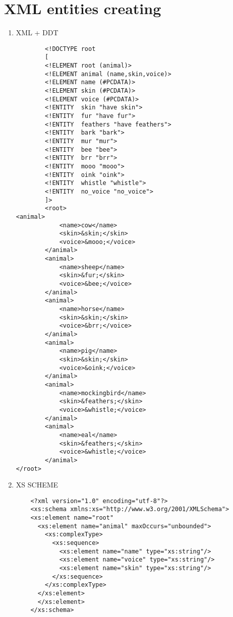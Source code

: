 \documentclass[10pt]{article}
\begin{document}
  \section{XML entities creating    \newline}
  \begin{enumerate}
    \item XML + DDT
    \begin{verbatim}
        <!DOCTYPE root
        [
        <!ELEMENT root (animal)>
        <!ELEMENT animal (name,skin,voice)>
        <!ELEMENT name (#PCDATA)>
        <!ELEMENT skin (#PCDATA)>
        <!ELEMENT voice (#PCDATA)>
        <!ENTITY  skin "have skin">
        <!ENTITY  fur "have fur">
        <!ENTITY  feathers "have feathers">
        <!ENTITY  bark "bark">
        <!ENTITY  mur "mur">
        <!ENTITY  bee "bee">
        <!ENTITY  brr "brr">
        <!ENTITY  mooo "mooo">
        <!ENTITY  oink "oink">
        <!ENTITY  whistle "whistle">
        <!ENTITY  no_voice "no_voice">
        ]>
        <root>
<animal>
            <name>cow</name>
            <skin>&skin;</skin>
            <voice>&mooo;</voice>
        </animal>
        <animal>
            <name>sheep</name>
            <skin>&fur;</skin>
            <voice>&bee;</voice>
        </animal>
        <animal>
            <name>horse</name>
            <skin>&skin;</skin>
            <voice>&brr;</voice>
        </animal>
        <animal>
            <name>pig</name>
            <skin>&skin;</skin>
            <voice>&oink;</voice>
        </animal>
        <animal>
            <name>mockingbird</name>
            <skin>&feathers;</skin>
            <voice>&whistle;</voice>
        </animal>
        <animal>
            <name>eal</name>
            <skin>&feathers;</skin>
            <voice>&whistle;</voice>
        </animal>
</root>
    \end{verbatim}
    \item XS SCHEME
    \begin{verbatim}
    <?xml version="1.0" encoding="utf-8"?>
    <xs:schema xmlns:xs="http://www.w3.org/2001/XMLSchema">
    <xs:element name="root"
      <xs:element name="animal" maxOccurs="unbounded">
        <xs:complexType>
          <xs:sequence>
            <xs:element name="name" type="xs:string"/>
            <xs:element name="voice" type="xs:string"/>
            <xs:element name="skin" type="xs:string"/>
          </xs:sequence>
        </xs:complexType>
      </xs:element>
      </xs:element>
    </xs:schema>
    \end{verbatim}
  \end{enumerate}
\end{document}
